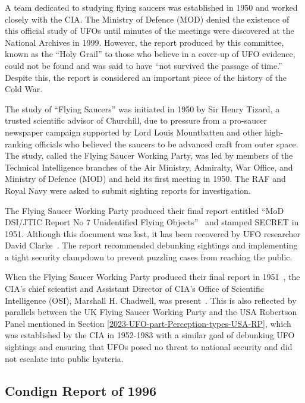 A team dedicated to studying flying saucers was established in 1950 and worked closely with the CIA. The Ministry of Defence (MOD) denied the existence of this official study of UFOs until minutes of the meetings were discovered at the National Archives in 1999. However, the report produced by this committee, known as the ``Holy Grail'' to those who believe in a cover-up of UFO evidence, could not be found and was said to have ``not survived the passage of time.'' Despite this, the report is considered an important piece of the history of the Cold War.

The study of ``Flying Saucers'' was initiated in 1950 by Sir Henry Tizard, a trusted scientific advisor of Churchill, due to pressure from a pro-saucer newspaper campaign supported by Lord Louis Mountbatten and other high-ranking officials who believed the saucers to be advanced craft from outer space. The study, called the Flying Saucer Working Party, was led by members of the Technical Intelligence branches of the Air Ministry, Admiralty, War Office, and Ministry of Defence (MOD) and held its first meeting in 1950. The RAF and Royal Navy were asked to submit sighting reports for investigation.

The Flying Saucer Working Party produced their final report entitled ``MoD DSI/JTIC Report No 7 Unidentified Flying Objects''~\cite{FSWP1951} and stamped SECRET in 1951. Although this document was lost, it has been recovered by UFO researcher David Clarke~\cite{ClarkeFSWP}. The report recommended debunking sightings and implementing a tight security clampdown to prevent puzzling cases from reaching the public.

When the Flying Saucer Working Party produced their final report in 1951~\cite{FSWP1951},
the CIA's chief scientist
and Assistant Director of CIA's Office of Scientific Intelligence (OSI), Marshall H. Chadwell, was present~\cite{Haines-CIA-UFO}. This is also reflected by parallels between the UK Flying Saucer Working Party and the USA Robertson Panel mentioned in Section \ref{2023-UFO-part-Perception-types-USA-RP}, which was established by the CIA in 1952-1983 with a similar goal of debunking UFO sightings and ensuring that UFOs posed no threat to national security and did not escalate into public hysteria.

\subsection{Condign Report of 1996}
\label{2023-UFO-part-Perception-types-UK-cr1996}

